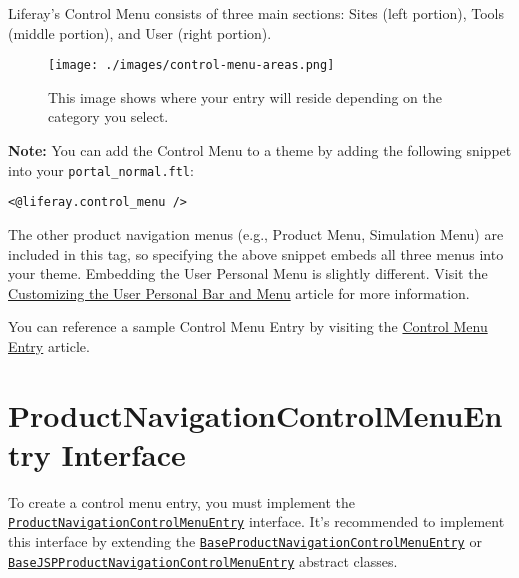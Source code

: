 Liferay's Control Menu consists of three main sections: Sites (left
portion), Tools (middle portion), and User (right portion).

\begin{figure}
\centering
\texttt{[image: ./images/control-menu-areas.png]}
\caption{This image shows where your entry will reside depending on the
category you select.}
\end{figure}

\noindent\hrulefill

\textbf{Note:} You can add the Control Menu to a theme by adding the
following snippet into your \texttt{portal\_normal.ftl}:

\begin{verbatim}
<@liferay.control_menu />
\end{verbatim}

The other product navigation menus (e.g., Product Menu, Simulation Menu)
are included in this tag, so specifying the above snippet embeds all
three menus into your theme. Embedding the User Personal Menu is
slightly different. Visit the
\href{/docs/7-2/customization/-/knowledge_base/c/customizing-the-user-personal-bar-and-menu}{Customizing
the User Personal Bar and Menu} article for more information.

\noindent\hrulefill

You can reference a sample Control Menu Entry by visiting the
\href{/docs/7-2/reference/-/knowledge_base/r/control-menu-entry-template}{Control
Menu Entry} article.

\section{ProductNavigationControlMenuEntry
Interface}\label{productnavigationcontrolmenuentry-interface}

To create a control menu entry, you must implement the
\href{https://docs.liferay.com/dxp/apps/product-navigation/latest/javadocs/com/liferay/product/navigation/control/menu/ProductNavigationControlMenuEntry.html}{\texttt{ProductNavigationControlMenuEntry}}
interface. It's recommended to implement this interface by extending the
\href{https://docs.liferay.com/dxp/apps/product-navigation/latest/javadocs/com/liferay/product/navigation/control/menu/BaseProductNavigationControlMenuEntry.html}{\texttt{BaseProductNavigationControlMenuEntry}}
or
\href{https://docs.liferay.com/dxp/apps/product-navigation/latest/javadocs/com/liferay/product/navigation/control/menu/BaseJSPProductNavigationControlMenuEntry.html}{\texttt{BaseJSPProductNavigationControlMenuEntry}}
abstract classes.

